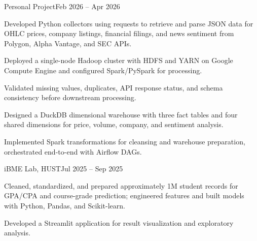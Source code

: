 
  {Personal Project}{Feb 2026 -- Apr 2026}
\begin{cvbullets}
  \item Developed Python collectors using requests to retrieve and parse JSON
    data for OHLC prices, company listings, financial filings, and news
    sentiment from Polygon, Alpha Vantage, and SEC APIs.
  \item Deployed a single-node Hadoop cluster with HDFS and YARN on Google
    Compute Engine and configured Spark/PySpark for processing.
  \item Validated missing values, duplicates, API response status, and schema
    consistency before downstream processing.
  \item Designed a DuckDB dimensional warehouse with three fact tables and
    four shared dimensions for price, volume, company, and sentiment analysis.
  \item Implemented Spark transformations for cleansing and warehouse
    preparation, orchestrated end-to-end with Airflow DAGs.
\end{cvbullets}

  {iBME Lab, HUST}{Jul 2025 -- Sep 2025}
\begin{cvbullets}
  \item Cleaned, standardized, and prepared approximately 1M student records
    for GPA/CPA and course-grade prediction; engineered features and built
    models with Python, Pandas, and Scikit-learn.
  \item Developed a Streamlit application for result visualization and
    exploratory analysis.
\end{cvbullets}
